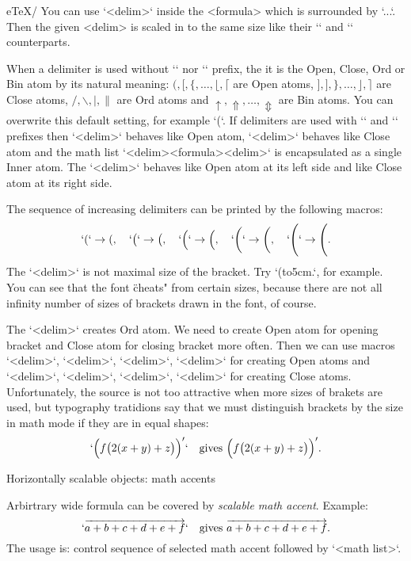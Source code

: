 \new e\TeX/
You can use `\middle<delim>` inside the <formula> which is surrounded by
`\left...\right`. Then the given <delim> is scaled in to the same size like
their `\left` and `\right` counterparts. 

When a delimiter is used without `\left` nor `\right` prefix, the it is the
Open, Close, Ord or Bin atom by its natural meaning:
$(, [, \{, \ldots, \lfloor, \lceil$ are Open atoms,
$], ], \}, \ldots, \rfloor, \rceil$ are Close atoms, 
$/, \backslash, |, \|$ are Ord atoms and 
$\uparrow, \Uparrow, \ldots, \Updownarrow$ are Bin atoms. You can overwrite
this default setting, for example `\mathclose(`. If delimiters are used with
`\left` and `\right` prefixes then `\left<delim>` behaves like Open atom,
`\right<delim>` behaves like Close atom and the math list
`\left<delim><formula>\right<delim>` is encapsulated as a single Inner atom.
The `\middle<delim>` behaves like Open atom at its left side and like Close
atom at its right side. 

The sequence of increasing delimiters can be printed by the following
macros:
$$
  `(` \to (,\quad `\big(` \to \big(,\quad `\Big(` \to \Big(,\quad
  `\bigg(` \to \bigg(, \quad `\Bigg(` \to \Bigg(.
$$
The `\Bigg<delim>` is not maximal size of the bracket. Try 
`\left(\vbox to5cm{}\right.`, for example. You can see that the font 
\"cheats" from certain sizes, because there are not all infinity number of
sizes of brackets drawn in the font, of course.

The `\big<delim>` creates Ord atom. We need to create Open atom
for opening bracket and Close atom for closing bracket more often. 
Then we can use macros
`\bigl<delim>`, 
`\Bigl<delim>`, 
`\biggl<delim>`, 
`\Biggl<delim>` for creating Open atoms and
`\bigr<delim>`, 
`\Bigr<delim>`, 
`\biggr<delim>`, 
`\Biggr<delim>` for creating Close atoms. Unfortunately, the source is not
too attractive when more sizes of brakets are used, but typography
tratidions say that we must distinguish brackets by the size in math
mode if they are in equal shapes:
$$
  `\Bigl( f\bigl( 2(x+y) + z\bigr) \Bigr)'` \quad \hbox{gives }
  \Bigl(f\bigl(2(x+y)+z\bigr)\Bigr)'. 
$$

\secc Horizontally scalable objects: math accents

Arbirtrary wide formula can be covered by {\em scalable math accent}.
Example:
$$
  `\overrightarrow {a+b+c+d+e+f}` \quad \hbox{gives } \overrightarrow {a+b+c+d+e+f}.
$$
The usage is: control sequence of selected math accent followed by `{<math list>}`.

